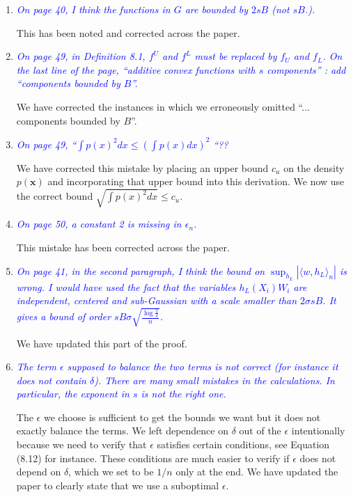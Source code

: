 \documentclass[pdftex,12pt]{article}
\def\rc#1{{\it\textcolor{blue}{#1}}\smallskip}
\begin{document}
\begin{enumerate}
\item \rc{On page 40, I think the functions in $G$ are bounded by $2sB$ (not $sB$.).}

This has been noted and corrected across the paper.

\item \rc{On page 49, in Definition 8.1, $f^U$ and $f^L$ must be replaced by $f_U$ and
$f_L$. On the last line of the page, ``additive convex functions with $s$
components'' : add ``components bounded by $B$''.}

We have corrected the instances in which we erroneously omitted ``... components bounded by $B$''.

\item \rc{On page 49, ``$\int p(x)^2dx \leq (\int p(x)dx)^2$ ``??}

We have corrected this mistake by placing an upper bound $c_u$ on the density $p(\mathbf{x})$ and incorporating that upper bound into this derivation. We now use the correct bound $\sqrt{ \int p(x)^2 dx } \leq c_u$.

\item \rc{On page 50, a constant 2 is missing in $\epsilon_n$.}

This mistake has been corrected across the paper.

\item \rc{On page 41, in the second paragraph, I think the bound on $\sup_{h_L} |⟨w,h_L⟩_n|$ is
wrong. I would have used the fact that the variables $h_L(X_i) W_i$ are
independent, centered and sub-Gaussian with a scale smaller than
$2\sigma s B$. It gives a bound of order $sB\sigma \sqrt{\frac{\log\frac{2}{\delta}}{n}}$.}

We have updated this part of the proof.

\item \rc{The term $\epsilon$ supposed to balance the two terms is not correct (for
instance it does not contain $\delta$). There are many small mistakes in the
calculations. In particular, the exponent in $s$ is not the right one.}

The $\epsilon$ we choose is sufficient to get the bounds we want but it does not exactly balance the terms. We left dependence on $\delta$ out of the $\epsilon$ intentionally because we need to verify that $\epsilon$ satisfies certain conditions, see Equation (8.12) for instance. These conditions are much easier to verify if $\epsilon$ does not depend on $\delta$, which we set to be $1/n$ only at the end. We have updated the paper to clearly state that we use a suboptimal $\epsilon$.


\end{enumerate}
\end{document}
